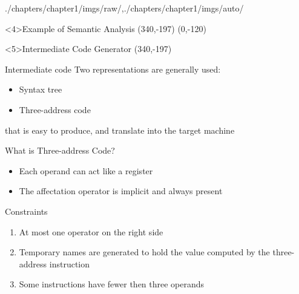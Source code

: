\begin{graphicspathcontext}{{./chapters/chapter1/imgs/raw/},{./chapters/chapter1/imgs/auto/}}
\begin{bibunit}[apalike]
\begin{frame}<4>{Example of Semantic Analysis}
	\putat*(340,-197){}
	\putat(0,-120){}
\end{frame}

\begin{frame}<5>{{Intermediate Code} Generator}
	\putat*(340,-197){}
	\begin{minipage}{.8\linewidth}
		\vspace{1cm}
		\begin{block}{Intermediate code}
			Two representations are generally used: \begin{itemize}
				\item Syntax tree
				\item Three-address code
			\end{itemize}
			that is easy to produce, and translate into the target machine
		\end{block}
	\end{minipage}
\end{frame}

\begin{frame}{{What is} Three-address Code?}
	\begin{itemize}
	\item Each operand can act like a register
	\item The affectation operator is implicit and always present
	\end{itemize}
	\begin{alertblock}{Constraints}
		\begin{enumerate}
			\item At most one operator on the right side
			\item Temporary names are generated to hold the value computed by the three-address instruction
			\item Some instructions have fewer then three operands
		\end{enumerate}
	\end{alertblock}
\end{frame}


\end{bibunit}
\end{graphicspathcontext}
